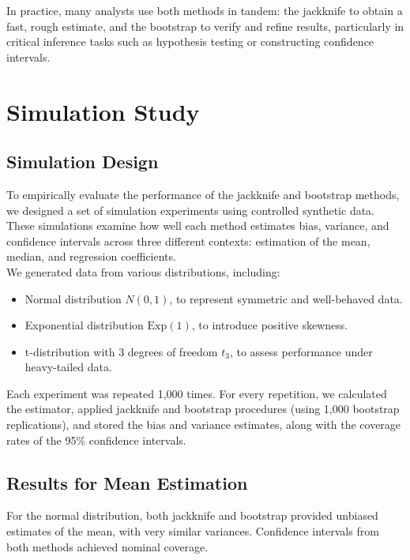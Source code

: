 \documentclass{article}
\begin{document}
In practice, many analysts use both methods in tandem: the jackknife to obtain a fast, rough estimate, and the bootstrap to verify and refine results, particularly in critical inference tasks such as hypothesis testing or constructing confidence intervals.\\

\section{Simulation Study}

\subsection{Simulation Design}

To empirically evaluate the performance of the jackknife and bootstrap methods, we designed a set of simulation experiments using controlled synthetic data. These simulations examine how well each method estimates bias, variance, and confidence intervals across three different contexts: estimation of the mean, median, and regression coefficients.\\

We generated data from various distributions, including:
\begin{itemize}
  \item Normal distribution \( N(0, 1) \), to represent symmetric and well-behaved data.
  \item Exponential distribution \( \text{Exp}(1) \), to introduce positive skewness.
  \item t-distribution with 3 degrees of freedom \( t_3 \), to assess performance under heavy-tailed data.
\end{itemize}

Each experiment was repeated 1,000 times. For every repetition, we calculated the estimator, applied jackknife and bootstrap procedures (using 1,000 bootstrap replications), and stored the bias and variance estimates, along with the coverage rates of the 95\% confidence intervals.\\

\subsection{Results for Mean Estimation}

For the normal distribution, both jackknife and bootstrap provided unbiased estimates of the mean, with very similar variances. Confidence intervals from both methods achieved nominal coverage.\\
\end{document}
